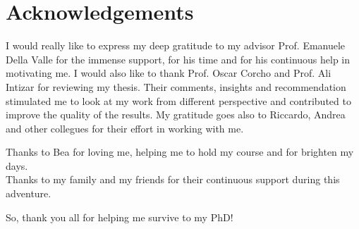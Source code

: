 \section*{Acknowledgements}

I would really like to express my deep gratitude to my advisor Prof. Emanuele Della Valle for the immense support, for his time and for his continuous help in motivating me.
I would also like to thank Prof. Oscar Corcho and Prof. Ali Intizar for reviewing my thesis. Their comments, insights and recommendation stimulated me to look at my work from different perspective and contributed to improve the quality of the results.
My gratitude goes also to Riccardo, Andrea and other collegues for their effort in working with me.

Thanks to Bea for loving me, helping me to hold my course and for brighten my days.\\
Thanks to my family and my friends for their continuous support during this adventure.

So, thank you all for helping me survive to my PhD!